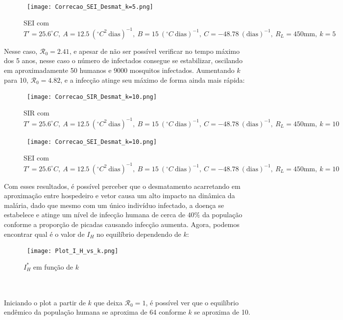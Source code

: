 \begin{figure}[!ht]
        \centering
        \hbox{\hspace{3.2em} \texttt{[image: Correcao\_SEI\_Desmat\_k=5.png]}}
        \caption{SEI com $T'=25.6 ^\circ C, \ A=12.5 \ (^\circ C^2 \ \text{dias})^{-1}, \ B=15 \ (^\circ C \ \text{dias})^{-1}, \ C=-48.78 \ (\text{dias})^{-1}, \ R_L=450 \text{mm}, \ k=5$}
\end{figure} 
\newpage
Nesse caso, $\mathcal{R}_0 = 2.41$, e apesar de não ser possível verificar no tempo 
máximo dos 5 anos, nesse caso o número de infectados consegue se estabilizar, 
oscilando em aproximadamente 50 humanos e 9000 mosquitos infectados. Aumentando $k$ para 10, 
$\mathcal{R}_0 = 4.82$, e a infecção atinge seu máximo de forma ainda mais rápida:
\begin{figure}[!ht]
        \centering
        \hbox{\hspace{4.2em} \texttt{[image: Correcao\_SIR\_Desmat\_k=10.png]}}
        \caption{SIR com $T'=25.6 ^\circ C, \ A=12.5 \ (^\circ C^2 \ \text{dias})^{-1}, \ B=15 \ (^\circ C \ \text{dias})^{-1}, \ C=-48.78 \ (\text{dias})^{-1}, \ R_L=450 \text{mm}, \ k=10$}
\end{figure} 
\begin{figure}[!ht]
        \centering
        \hbox{\hspace{4.2em} \texttt{[image: Correcao\_SEI\_Desmat\_k=10.png]}}
        \caption{SEI com $T'=25.6 ^\circ C, \ A=12.5 \ (^\circ C^2 \ \text{dias})^{-1}, \ B=15 \ (^\circ C \ \text{dias})^{-1}, \ C=-48.78 \ (\text{dias})^{-1}, \ R_L=450 \text{mm}, \ k=10$}
\end{figure} 
\newpage
Com esses resultados, é possível perceber que o desmatamento acarretando em aproximação
entre hospedeiro e vetor causa um alto impacto na dinâmica da malária,
dado que mesmo com um único indivíduo infectado, a doença se estabelece e atinge 
um nível de infecção humana de cerca de $40\%$ da população conforme a 
proporção de picadas causando infecção aumenta. Agora, podemos encontrar qual é o valor de $I_H$
no equilíbrio dependendo de $k$:
\begin{figure}[!ht]
        \centering
        \hbox{\hspace{4.2em} \texttt{[image: Plot\_I\_H\_vs\_k.png]}}
        \caption{$I_H^*$ em função de $k$}
\end{figure} 
\\\\
Iniciando o plot a partir de $k$ que deixa $\mathcal{R}_0 = 1$, é possível ver que
o equilíbrio endêmico da população humana se aproxima de 64 conforme $k$ se aproxima de 10.
